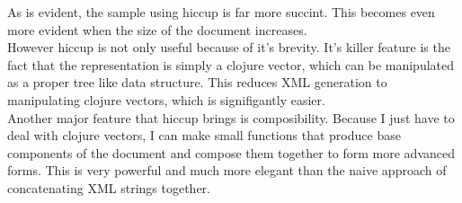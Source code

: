 As is evident, the sample using hiccup is far more succint. This becomes even more evident when the size of the document increases. \\

However hiccup is not only useful because of it's brevity. It's killer feature is the fact that the representation is simply a clojure vector, which can be manipulated as a proper tree like data structure. This reduces XML generation to manipulating clojure vectors, which is signifigantly easier.\\

Another major feature that hiccup brings is composibility. Because I just have to deal with clojure vectors, I can make small functions that produce base components of the document and compose them together to form more advanced forms. This is very powerful and much more elegant than the naive approach of concatenating XML strings together. \\
